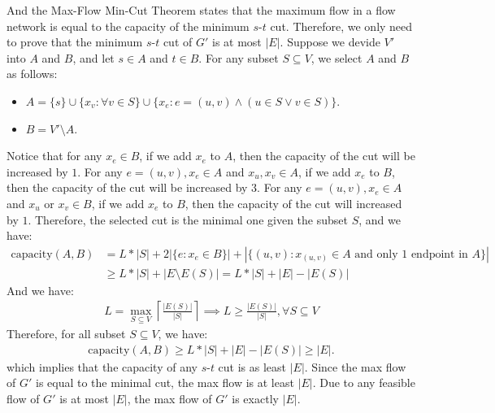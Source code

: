 \begin{answer}
\begin{enumerate}[label=\alph*).]
        And the Max-Flow Min-Cut Theorem states that the maximum flow in a flow network is equal to the capacity of the minimum $s$-$t$ cut. 
        Therefore, we only need to prove that the minimum $s$-$t$ cut of $G'$ is at most $|E|$. Suppose we devide $V'$ into $A$ and $B$, and let $s \in A$ and $t \in B$.
        For any subset $S \subseteq V$, we select $A$ and $B$ as follows:
        \begin{itemize}
            \item $A = \{s\} \cup \{x_v: \forall v \in S \} \cup \{x_e: e = (u,v) \land (u \in S \lor v \in S) \}$.
            \item $B = V' \setminus A$.
        \end{itemize}
        Notice that for any $x_e \in B$, if we add $x_e$ to $A$, then the capacity of the cut will be increased by $1$. 
        For any   $e = (u, v), x_e \in A$ and $x_u, x_v \in A$, if we add $x_e$ to $B$, then the capacity of the cut will be increased by $3$.
        For any $e = (u, v), x_e \in A$ and $x_u$ or $x_v \in B$, if we add $x_e$ to $B$, then the capacity of the cut will increased by $1$.
        Therefore, the selected cut is the minimal one given the subset $S$, and we have:
        \begin{align*}
            \text{capacity}(A, B) &= L*|S| + 2 |\{e: x_e \in B\}| + |\{(u,v):x_{(u,v)} \in A \text{ and only 1 endpoint in }A\}| \\ 
            &\ge L*|S| + |E \setminus E(S)| = L*|S| + |E| - |E(S)|
        \end{align*}
        And we have:
        \begin{align*}
            L = \max_{S\subseteq V}\left\lceil\frac{|E(S)|}{|S|}\right\rceil \implies L \ge \frac{|E(S)|}{|S|},  \forall S \subseteq V 
        \end{align*}
        Therefore, for all subset $S \subseteq V$, we have:
        \begin{align*}
            \text{capacity}(A, B) \ge L*|S| + |E| - |E(S)| \ge |E|.
        \end{align*}
        which implies that the capacity of any $s$-$t$ cut is as least $|E|$. Since the max flow of $G'$ is equal to the minimal cut, the max flow is at least $|E|$. 
        Due to any feasible flow of $G'$ is at most $|E|$, the max flow of $G'$ is exactly $|E|$.


\end{enumerate}
\end{answer}
